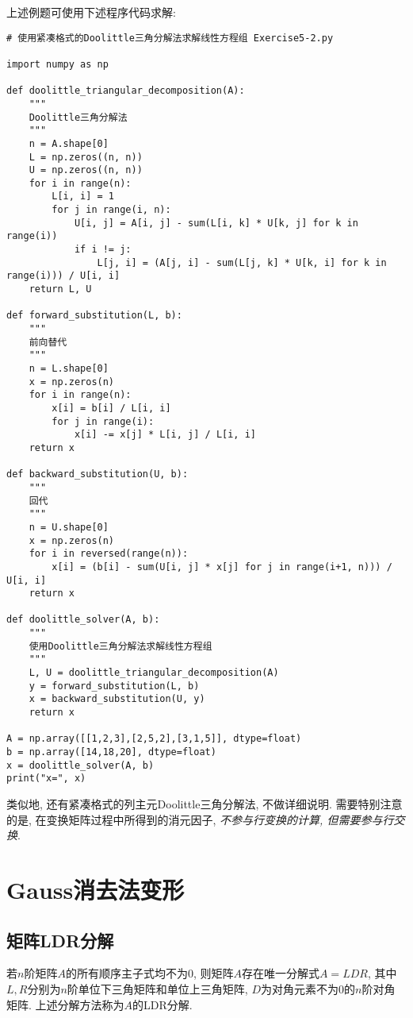 上述例题可使用下述程序代码求解:
\begin{lstlisting}
# 使用紧凑格式的Doolittle三角分解法求解线性方程组 Exercise5-2.py

import numpy as np

def doolittle_triangular_decomposition(A):
    """
    Doolittle三角分解法
    """
    n = A.shape[0]
    L = np.zeros((n, n))
    U = np.zeros((n, n)) 
    for i in range(n):
        L[i, i] = 1
        for j in range(i, n):
            U[i, j] = A[i, j] - sum(L[i, k] * U[k, j] for k in range(i))
            if i != j:
                L[j, i] = (A[j, i] - sum(L[j, k] * U[k, i] for k in range(i))) / U[i, i]
    return L, U

def forward_substitution(L, b):
    """
    前向替代
    """
    n = L.shape[0]
    x = np.zeros(n) 
    for i in range(n):
        x[i] = b[i] / L[i, i]
        for j in range(i):
            x[i] -= x[j] * L[i, j] / L[i, i]
    return x

def backward_substitution(U, b):
    """
    回代
    """
    n = U.shape[0]
    x = np.zeros(n)
    for i in reversed(range(n)):
        x[i] = (b[i] - sum(U[i, j] * x[j] for j in range(i+1, n))) / U[i, i]
    return x

def doolittle_solver(A, b):
    """
    使用Doolittle三角分解法求解线性方程组
    """
    L, U = doolittle_triangular_decomposition(A)
    y = forward_substitution(L, b)
    x = backward_substitution(U, y)
    return x

A = np.array([[1,2,3],[2,5,2],[3,1,5]], dtype=float)
b = np.array([14,18,20], dtype=float)
x = doolittle_solver(A, b)
print("x=", x)
\end{lstlisting}

类似地, 还有紧凑格式的列主元Doolittle三角分解法, 不做详细说明. 需要特别注意的是, 在变换矩阵过程中所得到的消元因子, \emph{不参与行变换的计算, 但需要参与行交换}. 

\section{Gauss消去法变形}

\subsection{矩阵LDR分解}

\begin{theorem}
    若$n$阶矩阵$A$的所有顺序主子式均不为0, 则矩阵$A$存在唯一分解式$A=LDR$, 其中$L, R$分别为$n$阶单位下三角矩阵和单位上三角矩阵, $D$为对角元素不为0的$n$阶对角矩阵. 上述分解方法称为$A$的LDR分解.
\end{theorem}

